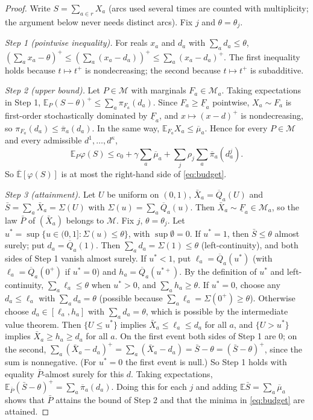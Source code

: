 \documentclass[11pt]{article}
\theoremstyle{definition}
\newcommand{\E}{\mathbb{E}}
\newcommand{\Eu}{\overline{\mathbb{E}}}
\newcommand{\Qb}{\overline{Q}}
\newcommand{\Fl}{\underline{F}}
\newcommand{\pib}{\overline{\pi}}
\newcommand{\mub}{\overline{\mu}}
\newcommand{\cM}{\mathcal{M}}
\newcommand{\pos}[1]{\left(#1\right)^{+}}
\begin{document}
\begin{proof}
Write $S=\sum_{a\in r}X_a$ (arcs used several times are counted with multiplicity; the argument below never needs distinct arcs). Fix $j$ and $\theta=\theta_j$.

\emph{Step 1 (pointwise inequality).} For reals $x_a$ and $d_a$ with $\sum_ad_a\le\theta$,
$\pos{\sum_ax_a-\theta}\le\pos{\sum_a(x_a-d_a)}\le\sum_a\pos{x_a-d_a}$. The first inequality holds because $t\mapsto t^+$ is nondecreasing; the second because $t\mapsto t^+$ is subadditive.

\emph{Step 2 (upper bound).} Let $P\in\cM$ with marginals $F_a\in\cM_a$. Taking expectations in Step 1,
$\E_P\pos{S-\theta}\le\sum_a\pi_{F_a}(d_a)$. Since $F_a\ge\Fl_a$ pointwise, $X_a\sim F_a$ is first-order stochastically dominated by $\Fl_a$, and $x\mapsto\pos{x-d}$ is nondecreasing, so $\pi_{F_a}(d_a)\le\pib_a(d_a)$. In the same way, $\E_{F_a}X_a\le\mub_a$. Hence for every $P\in\cM$ and every admissible $d^1,\dots,d^\kappa$,
\[
\E_P\varphi(S)\le c_0+\gamma\sum_a\mub_a+\sum_j\rho_j\sum_a\pib_a(d^j_a).
\]
So $\Eu[\varphi(S)]$ is at most the right-hand side of \eqref{eq:budget}.

\emph{Step 3 (attainment).} Let $U$ be uniform on $(0,1)$, $\bar X_a=\Qb_a(U)$ and $\bar S=\sum_a\bar X_a=\Sigma(U)$ with $\Sigma(u)=\sum_a\Qb_a(u)$. Then $\bar X_a\sim\Fl_a\in\cM_a$, so the law $\bar P$ of $(\bar X_a)$ belongs to $\cM$. Fix $j$, $\theta=\theta_j$. Let $u^*=\sup\{u\in(0,1]:\Sigma(u)\le\theta\}$, with $\sup\emptyset=0$.
If $u^*=1$, then $\bar S\le\theta$ almost surely; put $d_a=\Qb_a(1)$. Then $\sum_ad_a=\Sigma(1)\le\theta$ (left-continuity), and both sides of Step 1 vanish almost surely.
If $u^*<1$, put $\ell_a=\Qb_a(u^*)$ (with $\ell_a=\Qb_a(0^+)$ if $u^*=0$) and $h_a=\Qb_a(u^{*+})$. By the definition of $u^*$ and left-continuity, $\sum_a\ell_a\le\theta$ when $u^*>0$, and $\sum_ah_a\ge\theta$. If $u^*=0$, choose any $d_a\le\ell_a$ with $\sum_ad_a=\theta$ (possible because $\sum_a\ell_a=\Sigma(0^+)\ge\theta$). Otherwise choose $d_a\in[\ell_a,h_a]$ with $\sum_ad_a=\theta$, which is possible by the intermediate value theorem. Then $\{U\le u^*\}$ implies $\bar X_a\le\ell_a\le d_a$ for all $a$, and $\{U>u^*\}$ implies $\bar X_a\ge h_a\ge d_a$ for all $a$. On the first event both sides of Step 1 are $0$; on the second, $\sum_a\pos{\bar X_a-d_a}=\sum_a(\bar X_a-d_a)=\bar S-\theta=\pos{\bar S-\theta}$, since the sum is nonnegative. (For $u^*=0$ the first event is null.) So Step 1 holds with equality $\bar P$-almost surely for this $d$. Taking expectations, $\E_{\bar P}\pos{\bar S-\theta}=\sum_a\pib_a(d_a)$. Doing this for each $j$ and adding $\E\bar S=\sum_a\mub_a$ shows that $\bar P$ attains the bound of Step 2 and that the minima in \eqref{eq:budget} are attained.


\end{proof}
\end{document}
